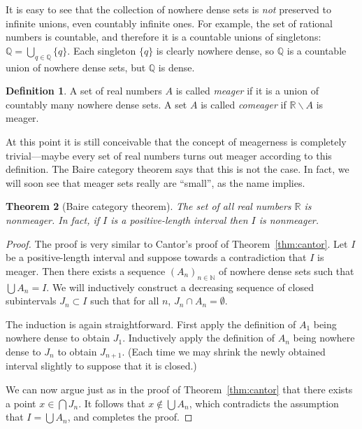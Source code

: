 \documentclass[11pt,oneside]{amsbook}
\newcommand{\N}{\mathbb N}
\newcommand{\Q}{\mathbb Q}
\newcommand{\R}{\mathbb R}
\theoremstyle{definition}
\theoremstyle{plain}
\newtheorem{theorem}{Theorem}[section]
\theoremstyle{definition}
\newtheorem{definition}[theorem]{Definition}
\theoremstyle{remark}
\numberwithin{equation}{section}
\numberwithin{figure}{section}
\begin{document}
It is easy to see that the collection of nowhere dense sets is \emph{not} preserved to infinite unions, even countably infinite ones. For example, the set of rational numbers is countable, and therefore it is a countable unions of singletons: $\Q=\bigcup_{q\in\Q}\{q\}$. Each singleton $\{q\}$ is clearly nowhere dense, so $\Q$ is a countable union of nowhere dense sets, but $\Q$ is dense.

\begin{definition}
  A set of real numbers $A$ is called \emph{meager} if it is a union of countably many nowhere dense sets. A set $A$ is called \emph{comeager} if $\R\smallsetminus A$ is meager.
\end{definition}

At this point it is still conceivable that the concept of meagerness is completely trivial---maybe every set of real numbers turns out meager according to this definition. The Baire category theorem says that this is not the case. In fact, we will soon see that meager sets really are ``small'', as the name implies.

\begin{theorem}[Baire category theorem]
  \label{thm:baire}
  The set of all real numbers $\R$ is nonmeager. In fact, if $I$ is a positive-length interval then $I$ is nonmeager.
\end{theorem}

\begin{proof}
  The proof is very similar to Cantor's proof of Theorem~\ref{thm:cantor}. Let $I$ be a positive-length interval and suppose towards a contradiction that $I$ is meager. Then there exists a sequence $(A_n)_{n\in\N}$ of nowhere dense sets such that $\bigcup A_n=I$. We will inductively construct a decreasing sequence of closed subintervals $J_n\subset I$ such that for all $n$, $J_n\cap A_n=\emptyset$.

  The induction is again straightforward. First apply the definition of $A_1$ being nowhere dense to obtain $J_1$. Inductively apply the definition of $A_n$ being nowhere dense to $J_n$ to obtain $J_{n+1}$. (Each time we may shrink the newly obtained interval slightly to suppose that it is closed.)

  We can now argue just as in the proof of Theorem~\ref{thm:cantor} that there exists a point $x\in\bigcap J_n$. It follows that $x\notin\bigcup A_n$, which contradicts the assumption that $I=\bigcup A_n$, and completes the proof.
\end{proof}
\end{document}
